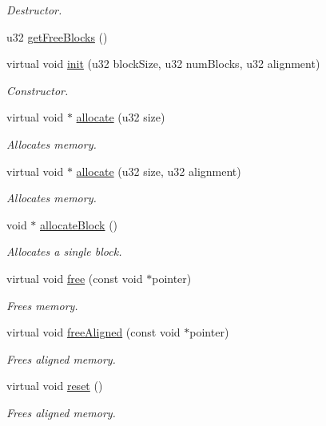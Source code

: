 \begin{DoxyCompactItemize}
\begin{DoxyCompactList}\small\item\em Destructor. \end{DoxyCompactList}\item 
u32 \hyperlink{classDE_1_1PoolAllocator_abb72ae0c4f9cc376cdab99095bd02575}{get\+Free\+Blocks} ()
\item 
virtual void \hyperlink{classDE_1_1PoolAllocator_acd4f99952bffbe85c229d85ca60b164b}{init} (u32 block\+Size, u32 num\+Blocks, u32 alignment)
\begin{DoxyCompactList}\small\item\em Constructor. \end{DoxyCompactList}\item 
virtual void $\ast$ \hyperlink{classDE_1_1PoolAllocator_a55472e9fd8cbe6455706c781c1b1f2d9}{allocate} (u32 size)
\begin{DoxyCompactList}\small\item\em Allocates memory. \end{DoxyCompactList}\item 
virtual void $\ast$ \hyperlink{classDE_1_1PoolAllocator_a06a558e5d2b8a09b0a38ad8c6a4e100e}{allocate} (u32 size, u32 alignment)
\begin{DoxyCompactList}\small\item\em Allocates memory. \end{DoxyCompactList}\item 
void $\ast$ \hyperlink{classDE_1_1PoolAllocator_a1213fac1617eb643b185e03704e1d0f1}{allocate\+Block} ()
\begin{DoxyCompactList}\small\item\em Allocates a single block. \end{DoxyCompactList}\item 
virtual void \hyperlink{classDE_1_1PoolAllocator_ac8566e6920e0f34f70c2f76758fbb68a}{free} (const void $\ast$pointer)
\begin{DoxyCompactList}\small\item\em Frees memory. \end{DoxyCompactList}\item 
virtual void \hyperlink{classDE_1_1PoolAllocator_af20c44a50efd12448f87b268e308fc92}{free\+Aligned} (const void $\ast$pointer)
\begin{DoxyCompactList}\small\item\em Frees aligned memory. \end{DoxyCompactList}\item 
virtual void \hyperlink{classDE_1_1PoolAllocator_aa425fa59a6e3f2043e2cac2731cae393}{reset} ()\hypertarget{classDE_1_1PoolAllocator_aa425fa59a6e3f2043e2cac2731cae393}{}\label{classDE_1_1PoolAllocator_aa425fa59a6e3f2043e2cac2731cae393}

\begin{DoxyCompactList}\small\item\em Frees aligned memory. \end{DoxyCompactList}\end{DoxyCompactItemize}
